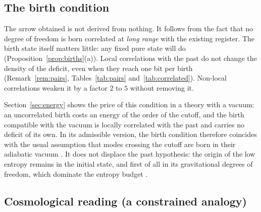 \subsection{The birth condition}

The arrow obtained is not derived from nothing. It follows from the fact that no degree of freedom is born correlated at \emph{long range} with the existing register. The birth state itself matters little: any fixed pure state will do (Proposition~\ref{prop:births}(a)). Local correlations with the past do not change the density of the deficit, even when they reach one bit per birth (Remark~\ref{rem:pairs}, Tables~\ref{tab:pairs} and~\ref{tab:correlated}). Non-local correlations weaken it by a factor $2$ to $5$ without removing it.

Section~\ref{sec:energy} shows the price of this condition in a theory with a vacuum: an uncorrelated birth costs an energy of the order of the cutoff, and the birth compatible with the vacuum is locally correlated with the past and carries no deficit of its own. In its admissible version, the birth condition therefore coincides with the usual assumption that modes crossing the cutoff are born in their adiabatic vacuum \cite{BunchDavies1978,MartinBrandenberger2001}. It does not displace the past hypothesis: the origin of the low entropy remains in the initial state, and first of all in its gravitational degrees of freedom, which dominate the entropy budget \cite{Penrose1989,EganLineweaver2010}.

\subsection{Cosmological reading (a constrained analogy)}

